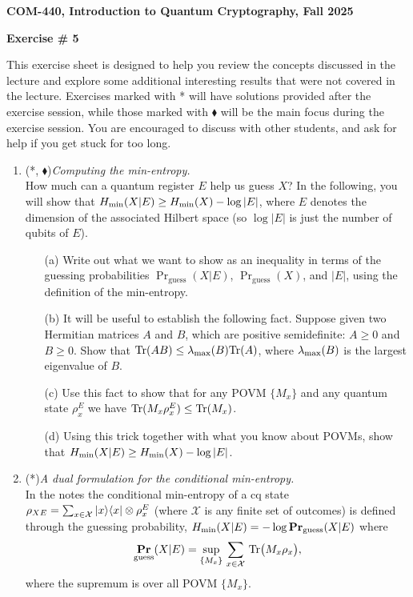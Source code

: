\documentclass[12pt]{article}
\newcommand{\header}[1]{\begin{center} {\large\bf #1} \end{center}}
\begin{document}
\header{COM-440, Introduction to Quantum Cryptography, Fall 2025}
\header{\bf Exercise \# 5}

This exercise sheet is designed to help you review the concepts discussed in the lecture and explore some additional interesting results that were not covered in the lecture. Exercises marked with * will have solutions provided after the exercise session, while those marked with $\blacklozenge$ will be the main focus during the exercise session. You are encouraged to discuss with other students, and ask for help if you get stuck for too long.

\begin{enumerate}

\item {(*, $\blacklozenge$)\em Computing the min-entropy.}\\
How much can a quantum register $E$ help us guess $X$? In the following, you will show that $H_{\rm min}(X|E) \geq H_{\rm min}(X) - \log |E|$, where $E$ denotes the dimension of the associated Hilbert space (so $\log |E|$ is just the number of qubits of $E$).
\begin{enumerate}
\item[(a)] Write out what we want to show as an inequality in terms of the guessing probabilities $\Pr_{\mathrm{guess}}(X \vert E)$, $\Pr_{\mathrm{guess}}(X)$, and $|E|$, using the definition of the min-entropy.
\item[(b)] It will be useful to establish the following fact. Suppose given two Hermitian matrices $A$ and $B$, which are positive semidefinite: $A \geq 0$ and $B \geq 0$. Show that $\mathrm{Tr}(AB) \leq \lambda_{\rm max}(B) \mathrm{Tr}(A)$, where $\lambda_{\rm max}(B)$ is the largest eigenvalue of $B$.
\item[(c)] Use this fact to show that for any POVM $\{M_x\}$ and any quantum state $\rho^E_x$ we have $\mathrm{Tr}(M_x \rho^E_x) \leq \mathrm{Tr}(M_x)$. 
\item[(d)] Using this trick together with what you know about POVMs, show that $H_{\rm min}(X|E) \geq H_{\rm min}(X) - \log |E|$. 
\end{enumerate}


\item {(*)\em A dual formulation for the conditional min-entropy.}\\
In the notes the conditional min-entropy of a cq state $\rho_{XE}  = \sum_{x\in\mathcal{X}} \ket{x}\!\bra{x}\otimes \rho_x^E$ (where $\mathcal{X}$ is any finite set of outcomes) is defined through the guessing probability, $H_{\rm min}(X|E) = -\log \mathop{\bf Pr\/}_{\rm guess}(X|E)$ where 
\begin{equation}\label{eq:pguess}
 \mathop{\bf Pr\/}_{\rm guess}(X|E) = \sup_{\{M_x\}}\,\sum_{x\in\mathcal{X}} \,\mathrm{Tr}\big(M_x\rho_x\big), 
\end{equation}
where the supremum is over all POVM $\{M_x\}$.


\end{enumerate}
\end{document}
